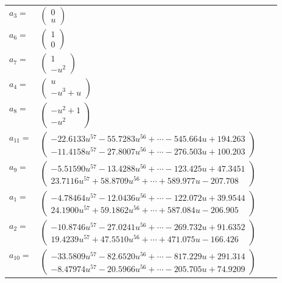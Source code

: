 \documentclass[1p]{elsarticle_modified}
\theoremstyle{definition}
\begin{document}
\begin{tabular}{m{7pt} m{180pt} m{7pt} m{180pt} }
\flushright $a_{3}=$&$\begin{pmatrix}0\\u\end{pmatrix}$ \\
\flushright $a_{6}=$&$\begin{pmatrix}1\\0\end{pmatrix}$ \\
\flushright $a_{7}=$&$\begin{pmatrix}1\\- u^2\end{pmatrix}$ \\
\flushright $a_{4}=$&$\begin{pmatrix}u\\- u^3+u\end{pmatrix}$ \\
\flushright $a_{8}=$&$\begin{pmatrix}- u^2+1\\- u^2\end{pmatrix}$ \\
\flushright $a_{11}=$&$\begin{pmatrix}-22.6133 u^{57}-55.7283 u^{56}+\cdots-545.664 u+194.263\\-11.4158 u^{57}-27.8007 u^{56}+\cdots-276.503 u+100.203\end{pmatrix}$ \\
\flushright $a_{9}=$&$\begin{pmatrix}-5.51590 u^{57}-13.4288 u^{56}+\cdots-123.425 u+47.3451\\23.7116 u^{57}+58.8709 u^{56}+\cdots+589.977 u-207.708\end{pmatrix}$ \\
\flushright $a_{1}=$&$\begin{pmatrix}-4.78464 u^{57}-12.0436 u^{56}+\cdots-122.072 u+39.9544\\24.1900 u^{57}+59.1862 u^{56}+\cdots+587.084 u-206.905\end{pmatrix}$ \\
\flushright $a_{2}=$&$\begin{pmatrix}-10.8746 u^{57}-27.0241 u^{56}+\cdots-269.732 u+91.6352\\19.4239 u^{57}+47.5510 u^{56}+\cdots+471.075 u-166.426\end{pmatrix}$ \\
\flushright $a_{10}=$&$\begin{pmatrix}-33.5809 u^{57}-82.6520 u^{56}+\cdots-817.229 u+291.314\\-8.47974 u^{57}-20.5966 u^{56}+\cdots-205.705 u+74.9209\end{pmatrix}$ \\

\end{tabular}
\end{document}
